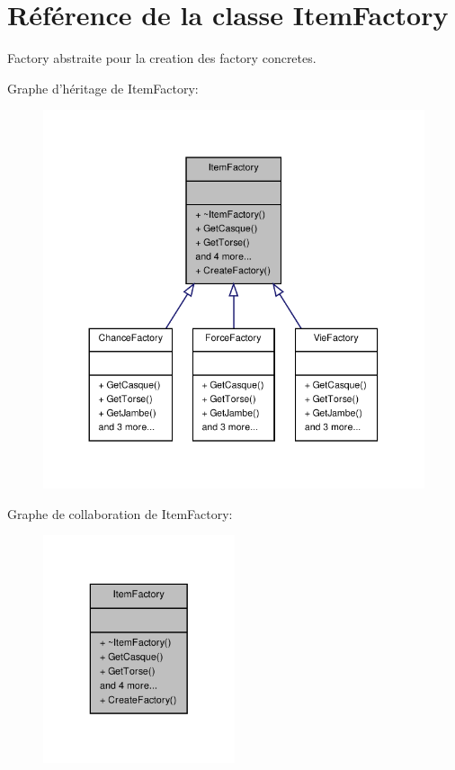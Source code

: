 \hypertarget{class_item_factory}{\section{Référence de la classe Item\-Factory}
\label{class_item_factory}
}


Factory abstraite pour la creation des factory concretes.  




Graphe d'héritage de Item\-Factory\-:
\nopagebreak
\begin{figure}[H]
\begin{center}
\leavevmode
\includegraphics[width=326pt]{class_item_factory__inherit__graph}
\end{center}
\end{figure}


Graphe de collaboration de Item\-Factory\-:
\nopagebreak
\begin{figure}[H]
\begin{center}
\leavevmode
\includegraphics[width=160pt]{class_item_factory__coll__graph}
\end{center}
\end{figure}
